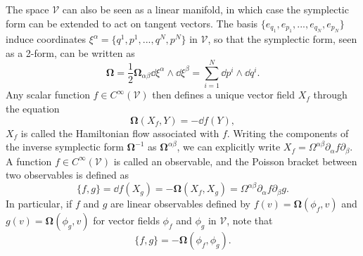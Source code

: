 The space $\mathcal{V}$ can also be seen as a linear manifold, in which case the symplectic form can be extended to act on tangent vectors. The basis $\{ e_{q_1},  e_{p_1},..., e_{q_N}, e_{p_N}\}$ induce coordinates $\xi^\alpha = \{q^1,p^1,...,q^N,p^N\}$ in $\mathcal{V}$, so that the symplectic form, seen as a 2-form, can be written as
\begin{equation}
    \bm \Omega = \frac{1}{2} \bm \Omega_{\alpha\beta} \dd\xi^\alpha\wedge \dd \xi^\beta = \sum_{i=1}^N \dd p^i \wedge \dd q^i.
\end{equation}
Any scalar function $f\in C^\infty(\mathcal{V})$ then defines a unique vector field $X_f$ through the equation 
\begin{equation}\label{eq:flowXf}
    \bm \Omega(X_f,Y) = - \dd f(Y),
\end{equation}
$X_f$ is called the Hamiltonian flow associated with $f$. Writing the components of the inverse symplectic form $\bm \Omega^{-1}$ as $\bm \Omega^{\alpha\beta}$, we can explicitly write $X_f = \Omega^{\alpha\beta}\partial_\alpha f\partial_\beta$. A function $f\in C^\infty(\mathcal{V})$ is called an observable, and the Poisson bracket between two observables is defined as
\begin{equation}\label{eq:poisson0}
    \{f,g\} = \dd f(X_g) = -\bm \Omega(X_f,X_g) = \Omega^{\alpha\beta}\partial_\alpha f \partial_\beta g.
\end{equation}
In particular, if $f$ and $g$ are linear observables defined by $f(v) = \bm \Omega(\phi_f,v)$ and $g(v) = \bm \Omega(\phi_g,v)$ for vector fields $\phi_f$ and $\phi_g$ in $\mathcal{V}$, note that
\begin{equation}\label{eq:pain}
        \{f,g\} = - \bm \Omega(\phi_f,\phi_g). %
\end{equation}



\cleardoublepage
{}		%


\printglossary[type=symbols]
\cleardoublepage
{}		%



